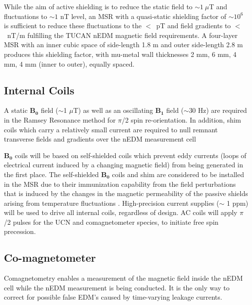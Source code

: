 
While the aim of active shielding is to reduce the static field to $\sim1~\mu$T and fluctuations to $\sim1$ nT level, an MSR with a quasi-static shielding factor of $\sim\mathrm{10^{6}}$ is sufficient to reduce these fluctuations to the $<$~pT and field gradients to $<$~nT/m fulfilling the TUCAN nEDM magnetic field requirements. A four-layer MSR with an inner cubic space of side-length 1.8 m and outer side-length 2.8 m produces this shielding factor, with mu-metal wall thicknesses 2 mm, 6 mm, 4 mm, 4 mm (inner to outer), equally spaced. 


\subsection{Internal Coils}

A static $\bm{B_0}$ field ($\sim$1 $\mu$T) as well as an oscillating $\bm{B_1}$ field ($\sim$30 Hz) are required in the Ramsey Resonance method for $\pi$/2 spin re-orientation. In addition, shim coils which carry a relatively small current are required to null remnant transverse fields and gradients over the nEDM measurement cell

$\bm{B_0}$ coils will be based on self-shielded coils which prevent eddy currents (loops of electrical current induced by a changing magnetic field) from being generated in the first place. The self-shielded $\bm{B_0}$ coils and shim are considered to be installed in the MSR due to their immunization capability from the field perturbations that is induced by the changes in the magnetic permeability of the passive shields arising from temperature fluctuations \cite{Andalib_temp}. High-precision current supplies ($\sim$ 1 ppm) will be used to drive all internal coils, regardless of design. AC coils will apply $\pi$/2 pulses for the UCN and comagnetometer species, to initiate free spin precession.

\subsection{Co-magnetometer}
Comagnetometry enables a measurement of the magnetic field inside the nEDM cell while the nEDM measurement is being conducted. It is the only way to correct for possible false EDM's caused by time-varying leakage currents. 

